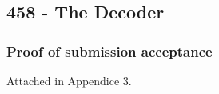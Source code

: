 \subsection{458 - The Decoder}



\subsubsection{Proof of submission acceptance}

Attached in Appendice 3.
